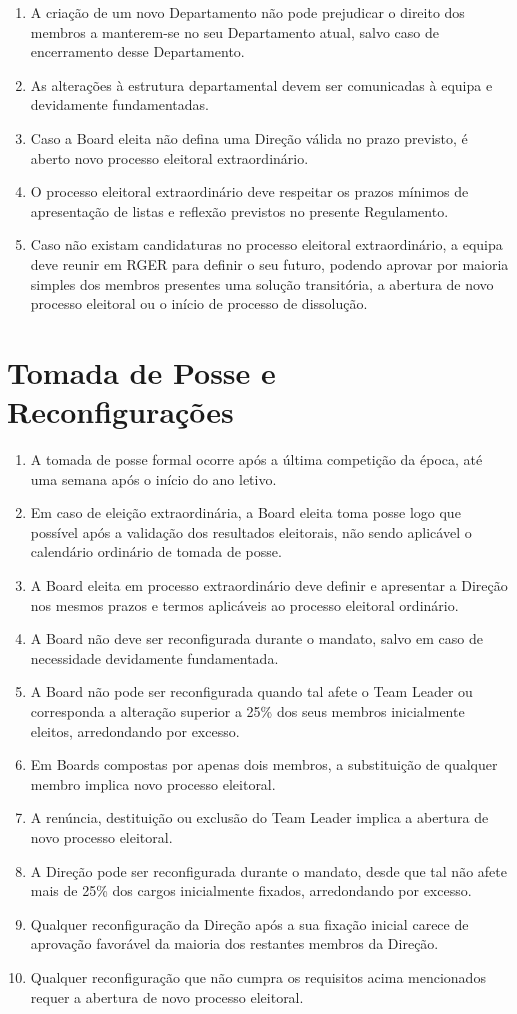 \begin{enumerate}
  \item A criação de um novo Departamento não pode prejudicar o direito dos membros a manterem-se no seu Departamento atual, salvo caso de encerramento desse Departamento.
  \item As alterações à estrutura departamental devem ser comunicadas à equipa e devidamente fundamentadas.
  \item Caso a Board eleita não defina uma Direção válida no prazo previsto, é aberto novo processo eleitoral extraordinário.
  \item O processo eleitoral extraordinário deve respeitar os prazos mínimos de apresentação de listas e reflexão previstos no presente Regulamento.
  \item Caso não existam candidaturas no processo eleitoral extraordinário, a equipa deve reunir em RGER para definir o seu futuro, podendo aprovar por maioria simples dos membros presentes uma solução transitória, a abertura de novo processo eleitoral ou o início de processo de dissolução.
\end{enumerate}

\section{Tomada de Posse e Reconfigurações}
\begin{enumerate}
  \item A tomada de posse formal ocorre após a última competição da época, até uma semana após o início do ano letivo.
  \item Em caso de eleição extraordinária, a Board eleita toma posse logo que possível após a validação dos resultados eleitorais, não sendo aplicável o calendário ordinário de tomada de posse.
  \item A Board eleita em processo extraordinário deve definir e apresentar a Direção nos mesmos prazos e termos aplicáveis ao processo eleitoral ordinário.
  \item A Board não deve ser reconfigurada durante o mandato, salvo em caso de necessidade devidamente fundamentada.
  \item A Board não pode ser reconfigurada quando tal afete o Team Leader ou corresponda a alteração superior a 25\% dos seus membros inicialmente eleitos, arredondando por excesso.
  \item Em Boards compostas por apenas dois membros, a substituição de qualquer membro implica novo processo eleitoral.
  \item A renúncia, destituição ou exclusão do Team Leader implica a abertura de novo processo eleitoral.
  \item A Direção pode ser reconfigurada durante o mandato, desde que tal não afete mais de 25\% dos cargos inicialmente fixados, arredondando por excesso.
  \item Qualquer reconfiguração da Direção após a sua fixação inicial carece de aprovação favorável da maioria dos restantes membros da Direção.
  \item Qualquer reconfiguração que não cumpra os requisitos acima mencionados requer a abertura de novo processo eleitoral.
\end{enumerate}
